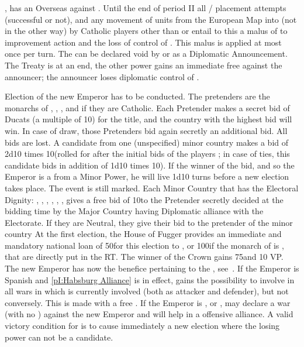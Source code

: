 , \POR has an Overseas \CB against \SPA.
 Until the end of period II all \COL/\TP
placement attempts (successful or not), and any movement of units from the
European Map into \ROTW (not in the other way) by Catholic players other than
\SPA or \POR entail to this \MAJ a malus of  to \STAB improvement
action and the loss of control of \payspapaute. This malus is applied at most
once per turn.
\aparag The  can be declared void by \POR or \SPA
as a Diplomatic Announcement. The Treaty is at an end, the other power gains
an immediate free  against the announcer; the announcer loses
diplomatic control of \payspapaute.





\phevnt
\aparag Election of the new Emperor has to be conducted. The pretenders are
the monarchs of \SPA, \FRA, \ENG, and \POL if they are Catholic.  Each
Pretender makes a secret bid of Ducats (a multiple of 10\ducats) for the
title, and the country with the highest bid will win. In case of draw, those
Pretenders bid again secretly an additional bid. All bids are lost.
\aparag A candidate from one (unspecified) minor country makes a bid of 2d10
times 10\ducats (rolled for after the initial bids of the players ; in case of
ties, this candidate bids in addition of 1d10 times 10\ducats). If the winner
of the bid, and so the Emperor is a from a Minor Power, he will live 1d10
turns before a new election takes place. The event is still marked.
\aparag Each Minor Country that has the Electoral Dignity: \paysCologne,
\paysPalatinat, \paysSaxe, \paysTreves, \paysMayence, \paysBrandebourg,
\paysBoheme gives a free bid of 10\ducats to the Pretender secretly decided at
the bidding time by the Major Country having Diplomatic alliance with the
Electorate. If they are Neutral, they give their bid to the pretender of the
minor country
\aparag At the first election, the House of Fugger provides an immediate and
mandatory national loan of 50\ducats for this election
to \SPA, or 100\ducats if the monarch of \SPA is , that
are directly put in the RT.
\aparag The winner of the Crown gains 75\ducats and 10 VP.
\aparag The new Emperor has now the benefice pertaining to the \HRE,
see~.
\aparag If the Emperor is Spanish and \ref{pI:Habsburg Alliance} is in effect,
\SPA gains the possibility to involve \HAB in all wars in which \SPA is
currently involved (both as attacker and defender), but not conversely. This
is made with a free \CB.
\aparag If the Emperor is \FRA, \ENG or \POL, \SPA may declare a war (with no
\CB) against the new Emperor and \AUSaus will help in a offensive alliance. A
valid victory condition for \SPA is to cause immediately a new election where
the losing power can not be a candidate.

